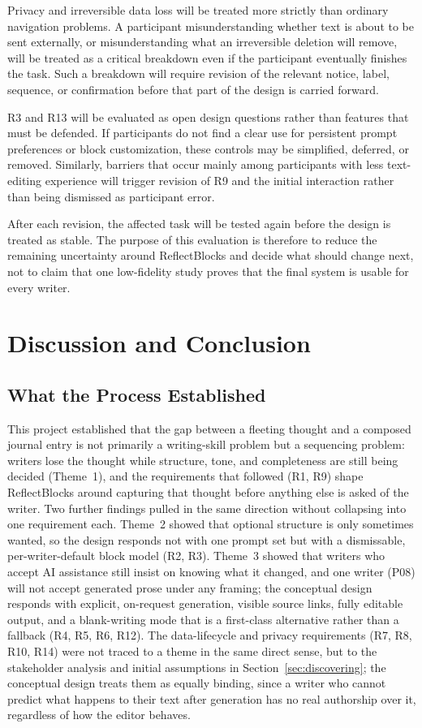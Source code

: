 \documentclass[sigconf,nonacm]{acmart}
\begin{document}
Privacy and irreversible data loss will be treated more strictly than ordinary
navigation problems. A participant misunderstanding whether text is about to be
sent externally, or misunderstanding what an irreversible deletion will remove,
will be treated as a critical breakdown even if the participant eventually
finishes the task. Such a breakdown will require revision of the relevant notice,
label, sequence, or confirmation before that part of the design is carried
forward.

R3 and R13 will be evaluated as open design questions rather than features that
must be defended. If participants do not find a clear use for persistent prompt
preferences or block customization, these controls may be simplified, deferred,
or removed. Similarly, barriers that occur mainly among participants with less
text-editing experience will trigger revision of R9 and the initial interaction
rather than being dismissed as participant error.

After each revision, the affected task will be tested again before the design is
treated as stable. The purpose of this evaluation is therefore to reduce the
remaining uncertainty around ReflectBlocks and decide what should change next,
not to claim that one low-fidelity study proves that the final system is usable
for every writer.

\section{Discussion and Conclusion}

\subsection{What the Process Established}

This project established that the gap between a fleeting thought and a
composed journal entry is not primarily a writing-skill problem but a
sequencing problem: writers lose the thought while structure, tone, and
completeness are still being decided (Theme~1), and the requirements that
followed (R1, R9) shape ReflectBlocks around capturing that thought before
anything else is asked of the writer. Two further findings pulled in the
same direction without collapsing into one requirement each. Theme~2 showed
that optional structure is only sometimes wanted, so the design responds not
with one prompt set but with a dismissable, per-writer-default block model
(R2, R3). Theme~3 showed that writers who accept AI assistance still
insist on knowing what it changed, and one writer (P08) will not accept
generated prose under any framing; the conceptual design responds with
explicit, on-request generation, visible source links, fully editable
output, and a blank-writing mode that is a first-class alternative rather
than a fallback (R4, R5, R6, R12). The data-lifecycle and privacy
requirements (R7, R8, R10, R14) were not traced to a theme in the same
direct sense, but to the stakeholder analysis and initial assumptions in
Section~\ref{sec:discovering}; the conceptual design treats them as equally
binding, since a writer who cannot predict what happens to their text after
generation has no real authorship over it, regardless of how the editor
behaves.
\end{document}
